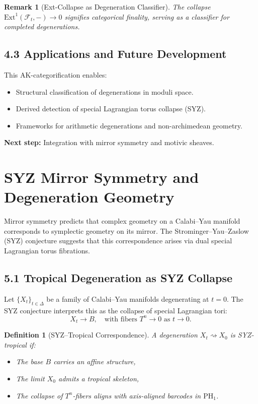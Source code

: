 \documentclass[11pt]{article}
\newtheorem{definition}[theorem]{Definition}
\newtheorem{remark}[theorem]{Remark}
\begin{document}
\begin{remark}[Ext-Collapse as Degeneration Classifier]
The collapse \( \mathrm{Ext}^1(\mathcal{F}_t, -) \to 0 \) signifies categorical finality, serving as a classifier for completed degenerations.
\end{remark}

\subsection{4.3 Applications and Future Development}

This AK-categorification enables:
\begin{itemize}
    \item Structural classification of degenerations in moduli space.
    \item Derived detection of special Lagrangian torus collapse (SYZ).
    \item Frameworks for arithmetic degenerations and non-archimedean geometry.
\end{itemize}

\textbf{Next step:} Integration with mirror symmetry and motivic sheaves.


\section{SYZ Mirror Symmetry and Degeneration Geometry}

Mirror symmetry predicts that complex geometry on a Calabi–Yau manifold corresponds to symplectic geometry on its mirror.  
The Strominger–Yau–Zaslow (SYZ) conjecture suggests that this correspondence arises via dual special Lagrangian torus fibrations.

\subsection{5.1 Tropical Degeneration as SYZ Collapse}

Let \( \{X_t\}_{t \in \Delta} \) be a family of Calabi–Yau manifolds degenerating at \( t = 0 \).  
The SYZ conjecture interprets this as the collapse of special Lagrangian tori:
\[
X_t \to B, \quad \text{with fibers } T^n \to 0 \text{ as } t \to 0.
\]

\begin{definition}[SYZ–Tropical Correspondence]
A degeneration \( X_t \rightsquigarrow X_0 \) is SYZ-tropical if:
\begin{itemize}
    \item The base \( B \) carries an affine structure,
    \item The limit \( X_0 \) admits a tropical skeleton,
    \item The collapse of \( T^n \)-fibers aligns with axis-aligned barcodes in \( \mathrm{PH}_1 \).
\end{itemize}
\end{definition}
\end{document}
